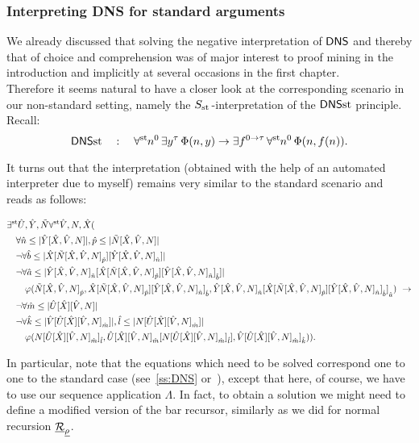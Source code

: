 \subsubsection*{Interpreting DNS for standard arguments}

We already discussed that solving the negative interpretation of $\textsf{\upshape DNS}$ and thereby that
of choice and comprehension was of major interest to proof mining in the introduction and 
implicitly at several occasions in the first chapter.\\
Therefore it seems natural to have a closer look at the corresponding scenario in
our non-standard setting, namely the $\protect{S_{\operatorname{st}{}}}$-interpretation of the $\textsf{\upshape DNS}{\operatorname{st}}$ principle. Recall:
\[
\textsf{\upshape DNS}{\operatorname{st}}\quad :\quad \forall^{\operatorname{st}{}}\! n^0 \, \exists y^\tau \, \Phi(n, y) \to \exists f^{0 \to \tau} \, \forall^{\operatorname{st}{}}\! n^0 \, \Phi(n, f(n)).
\]

It turns out that the interpretation (obtained with the help of an automated 
interpreter due to myself) remains very similar to the standard scenario and reads as follows:

\begin{small}
\begin{align*}
 &\exists^{\operatorname{st}{}}\! \hat U,\hat Y,\tilde N\forall^{\operatorname{st}{}}\! \hat V,N,\hat X( \\ 
 &\quad \forall \hat n\leq |\hat Y[\hat X,\hat V,N]|, 
                \hat p\leq |\tilde N[\hat X,\hat V,N]| \\
 &\quad \neg\forall \hat b\leq |\hat X[{\tilde N[\hat X,\hat V,N]}_{\hat p}][{\hat Y[\hat X,\hat V,N]}_{\hat n}]| \\
 &\quad \neg\forall \hat a\leq |{\hat Y[\hat X,\hat V,N]}_{\hat n}[{\hat X[{\tilde N[\hat X,\hat V,N]}_{\hat p}][{\hat Y[\hat X,\hat V,N]}_{\hat n}]}_{\hat b}]| \\ 
 &\quad\quad 
    \varphi({\tilde N[\hat X,\hat V,N]}_{\hat p},{\hat X[{\tilde N[\hat X,\hat V,N]}_{\hat p}][{\hat Y[\hat X,\hat V,N]}_{\hat n}]}_{\hat b},{{\hat Y[\hat X,\hat V,N]}_{\hat n}[{\hat X[{\tilde N[\hat X,\hat V,N]}_{\hat p}][{\hat Y[\hat X,\hat V,N]}_{\hat n}]}_{\hat b}]}_{\hat a})\ \rightarrow\\
 &\quad \neg\forall \hat m\leq |\hat U[\hat X][\hat V,N]|\\
 &\quad \neg\forall \hat k\leq |\hat V[{\hat U[\hat X][\hat V,N]}_{\hat m}]|,\hat l\leq |N[{\hat U[\hat X][\hat V,N]}_{\hat m}]| \\ 
 &\quad\quad \varphi({N[{\hat U[\hat X][\hat V,N]}_{\hat m}]}_{\hat l},{\hat U[\hat X][\hat V,N]}_{\hat m}[{N[{\hat U[\hat X][\hat V,N]}_{\hat m}]}_{\hat l}],{\hat V[{\hat U[\hat X][\hat V,N]}_{\hat m}]}_{\hat k})).
\end{align*}
\end{small}

In particular, note that the equations which need to be solved correspond one to one to the standard case (see~\ref{ss:DNS} or~\cite{Kohlenbach08}), except that here, of course, we have to use our sequence application $\Lambda$. In fact, to obtain a solution we might need to define a modified version of the bar recursor, similarly as we did for normal recursion $\underline{\mathcal{R}}_{\underline{\rho}}$.
